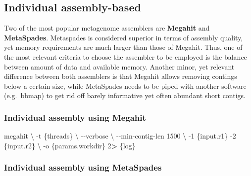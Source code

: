 \documentclass[
]{book}
\newenvironment{Shaded}{\begin{snugshade}}{\end{snugshade}}
\newcommand{\AttributeTok}[1]{\textcolor[rgb]{0.77,0.63,0.00}{#1}}
\newcommand{\DataTypeTok}[1]{\textcolor[rgb]{0.13,0.29,0.53}{#1}}
\newcommand{\DecValTok}[1]{\textcolor[rgb]{0.00,0.00,0.81}{#1}}
\newcommand{\ExtensionTok}[1]{#1}
\newcommand{\NormalTok}[1]{#1}
\newcommand{\OperatorTok}[1]{\textcolor[rgb]{0.81,0.36,0.00}{\textbf{#1}}}
\begin{document}
\hypertarget{individual-assembly-based}{%
\subsection*{Individual assembly-based}\label{individual-assembly-based}}

Two of the most popular metagenome assemblers are \textbf{Megahit} and \textbf{MetaSpades}. Metaspades is considered superior in terms of assembly quality, yet memory requirements are much larger than those of Megahit. Thus, one of the most relevant criteria to choose the assembler to be employed is the balance between amount of data and available memory. Another minor, yet relevant difference between both assemblers is that Megahit allows removing contings below a certain size, while MetaSpades needs to be piped with another software (e.g.~bbmap) to get rid off barely informative yet often abundant short contigs.

\hypertarget{individual-assembly-using-megahit}{%
\subsubsection*{Individual assembly using Megahit}\label{individual-assembly-using-megahit}}

\small

\begin{Shaded}
\begin{Highlighting}[]
\ExtensionTok{megahit} \DataTypeTok{\textbackslash{}}
    \AttributeTok{{-}t}\NormalTok{ \{threads\} }\DataTypeTok{\textbackslash{}}
    \AttributeTok{{-}{-}verbose} \DataTypeTok{\textbackslash{}}
    \AttributeTok{{-}{-}min{-}contig{-}len}\NormalTok{ 1500 }\DataTypeTok{\textbackslash{}}
    \AttributeTok{{-}1}\NormalTok{ \{input.r1\} }\AttributeTok{{-}2}\NormalTok{ \{input.r2\} }\DataTypeTok{\textbackslash{}}
    \AttributeTok{{-}o}\NormalTok{ \{params.workdir\}}
    \DecValTok{2}\OperatorTok{\textgreater{}}\NormalTok{ \{log\}}
\end{Highlighting}
\end{Shaded}

\normalsize

\hypertarget{individual-assembly-using-metaspades}{%
\subsubsection*{Individual assembly using MetaSpades}\label{individual-assembly-using-metaspades}}
\end{document}
